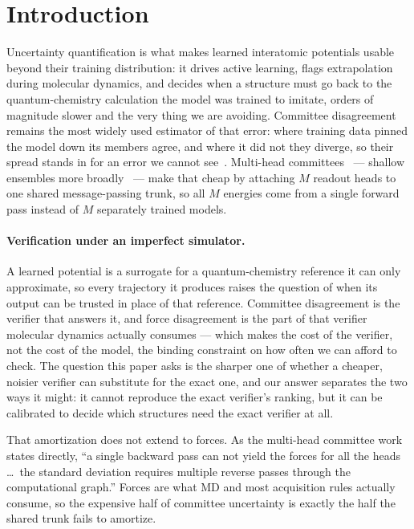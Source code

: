 \documentclass{article}
\begin{document}
\section{Introduction}
Uncertainty quantification is what makes learned interatomic potentials usable beyond their training
distribution: it drives active learning, flags extrapolation during molecular dynamics, and decides
when a structure must go back to the quantum-chemistry calculation the model was trained to imitate,
orders of magnitude slower and the very thing we are avoiding. Committee disagreement remains the
most widely used estimator of that error: where training data pinned the model down its members
agree, and where it did not they diverge, so their spread stands in for an error we cannot
see~\citep{behler2015,podryabinkin2017,carrete2023}. Multi-head
committees~\citep{beck2025mhc} --- shallow ensembles more broadly~\citep{kellner2024} --- make that
cheap by attaching $M$ readout heads to one shared message-passing trunk, so all $M$ energies come
from a single forward pass instead of $M$ separately trained models.

\paragraph{Verification under an imperfect simulator.}
A learned potential is a surrogate for a quantum-chemistry reference it can only approximate, so
every trajectory it produces raises the question of when its output can be trusted in place of that
reference. Committee disagreement is the verifier that answers it, and force disagreement is the
part of that verifier molecular dynamics actually consumes --- which makes the cost of the verifier,
not the cost of the model, the binding constraint on how often we can afford to check. The question
this paper asks is the sharper one of whether a cheaper, noisier verifier can substitute for the
exact one, and our answer separates the two ways it might: it cannot reproduce the exact verifier's
ranking, but it can be calibrated to decide which structures need the exact verifier at all.

That amortization does not extend to forces. As the multi-head committee work states directly, ``a
single backward pass can not yield the forces for all the heads \ldots\ the standard deviation
requires multiple reverse passes through the computational graph.'' Forces are what MD and most
acquisition rules actually consume, so the expensive half of committee uncertainty is exactly the
half the shared trunk fails to amortize.
\end{document}
